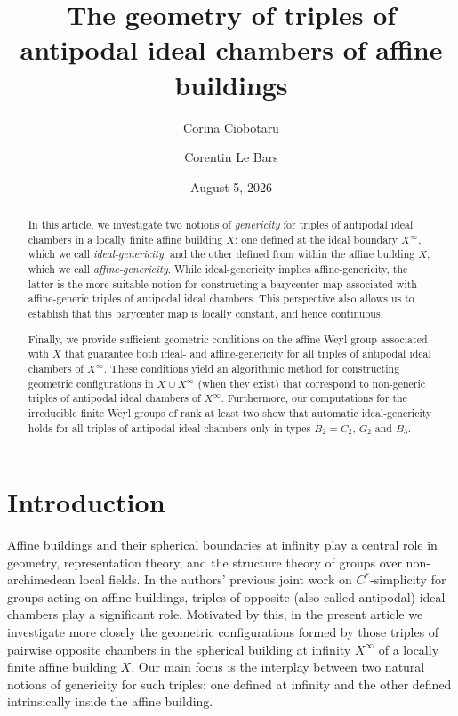 \documentclass[11pt]{amsart}
\title[]{The geometry of triples of antipodal ideal chambers of affine buildings}
\author{Corina Ciobotaru} \address{Department of Mathematics, Aarhus University, Denmark} \email{cociobotaru@math.au.dk}
\author{Corentin Le Bars} \address{DMA, \'Ecole Normale Sup\'erieure, PSL University, France} \email{corentin.le.bars@math.ens.psl.eu}
\date{August 5, 2026}
\theoremstyle{plain}
\theoremstyle{definition}
\theoremstyle{remark}
\begin{document}
	\begin{abstract}
		In this article, we investigate two notions of \emph{genericity} for triples of antipodal ideal chambers in a locally finite affine building \(X\): one defined at the ideal boundary \(X^{\infty}\), which we call \emph{ideal-genericity}, and the other defined from within the affine building \(X\), which we call \emph{affine-genericity}. While ideal-genericity implies affine-genericity, the latter is the more suitable notion for constructing a barycenter map associated with affine-generic triples of antipodal ideal chambers. This perspective also allows us to establish that this barycenter map is locally constant, and hence continuous. 
		
		Finally, we provide sufficient geometric conditions on the affine Weyl group associated with $X$ that guarantee both ideal- and affine-genericity for all triples of antipodal ideal chambers of $X^\infty$. These conditions yield an algorithmic method for constructing geometric configurations in $X \cup X^{\infty}$ (when they exist) that correspond to non-generic triples of antipodal ideal chambers of $X^{\infty}$. Furthermore, our computations for the irreducible finite Weyl groups of rank at least two show that automatic ideal-genericity holds for all triples of antipodal ideal chambers only in types $B_2 = C_2$, $G_2$ and $B_3$.
	\end{abstract}
	\maketitle	
	
	
	\setcounter{tocdepth}{1}
	\tableofcontents
	
	
	
	\section{Introduction}
	
	Affine buildings  and their spherical boundaries at infinity  play a central role in geometry, representation theory, and the structure theory of groups over non-archimedean local fields. In the authors' previous joint work \cite{CiBars} on $C^\ast$-simplicity for groups acting on affine buildings, triples of opposite (also called antipodal) ideal chambers play a significant role. Motivated by this, in the present article we investigate more closely the geometric configurations formed by those triples of pairwise opposite chambers in the spherical building at infinity $X^\infty$ of a locally finite affine building $X$. Our main focus is the interplay between two natural notions of genericity for such triples: one defined at infinity and the other defined intrinsically inside the affine building.
	
\end{document}
